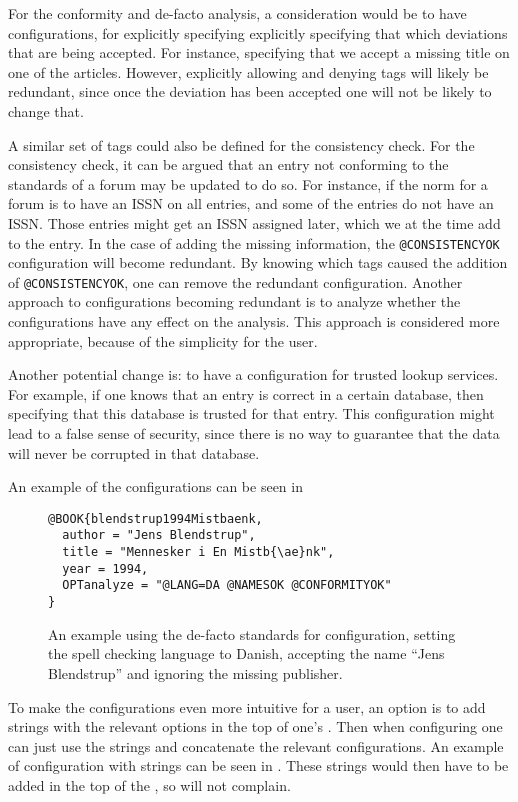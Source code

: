For the conformity and de-facto analysis, a consideration would be to
have configurations, for explicitly specifying explicitly specifying
that which deviations that are being accepted.  For instance,
specifying that we accept a missing title on one of the articles.
However, explicitly allowing and denying tags will likely be
redundant, since once the deviation has been accepted one will not be
likely to change that.

A similar set of tags could also be defined for the consistency check.
For the consistency check, it can be argued that an entry not
conforming to the standards of a forum may be updated to do so.  For
instance, if the norm for a forum is to have an ISSN on all entries,
and some of the entries do not have an ISSN.  Those entries might get
an ISSN assigned later, which we at the time add to the entry.  In the
case of adding the missing information, the \texttt{@CONSISTENCYOK}
configuration will become redundant.  By knowing which tags caused the
addition of \texttt{@CONSISTENCYOK}, one can remove the redundant
configuration.  Another approach to configurations becoming redundant
is to analyze whether the configurations have any effect on the
analysis.  This approach is considered more appropriate, because of
the simplicity for the user.

Another potential change is: to have a configuration for trusted
lookup services.  For example, if one knows that an entry is correct
in a certain database, then specifying that this database is trusted
for that entry.  This configuration might lead to a false sense of
security, since there is no way to guarantee that the data will never
be corrupted in that database.

An example of the configurations can be seen in

\begin{figure}
  \centering
\begin{verbatim}
@BOOK{blendstrup1994Mistbaenk,
  author = "Jens Blendstrup",
  title = "Mennesker i En Mistb{\ae}nk",
  year = 1994,
  OPTanalyze = "@LANG=DA @NAMESOK @CONFORMITYOK"
}
\end{verbatim}
  \caption{An example using the de-facto standards for configuration,
    setting the spell checking language to Danish, accepting the name
    ``Jens Blendstrup'' and ignoring the missing publisher.}
  \label{fig:analyzing_added_de_facto_standards}
\end{figure}

To make the configurations even more intuitive for a {\bibtex} user,
an option is to add {\bibtex} strings with the relevant options in the
top of one's .  Then when configuring one can just use the
{\bibtex} strings and concatenate the relevant configurations.  An
example of configuration with strings can be seen in
.  These
strings would then have to be added in the top of the , so
{\bibtex} will not complain.

